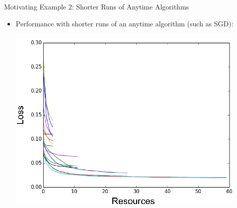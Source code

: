 \begin{frame}[c]{Motivating Example 2: Shorter Runs of Anytime Algorithms}

\begin{itemize}
    \item Performance with shorter runs of an anytime algorithm (such as SGD):\\~\\
\centering
\includegraphics[width=0.5\linewidth]{../w07_hpo_speedup/images/hyperband/Figure_1_2.png}

\end{itemize}
\end{frame}


